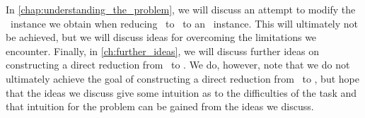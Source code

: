 In \cref{chap:understanding_the_problem}, we will discuss an attempt to modify the \EndOfLine\ instance we obtain when reducing \Tarski\ to \EndOfLine\ to an \EndOfPotentialLine\ instance. This will ultimately not be achieved, but we will discuss ideas for overcoming the limitations we encounter. Finally, in \cref{ch:further_ideas}, we will discuss further ideas on constructing a direct reduction from \Tarski\ to \EndOfPotentialLine. We do, however, note that we do not ultimately achieve the goal of constructing a direct reduction from \Tarski\ to \EndOfPotentialLine\@, but hope that the ideas we discuss give some intuition as to the difficulties of the task and that intuition for the problem can be gained from the ideas we discuss.